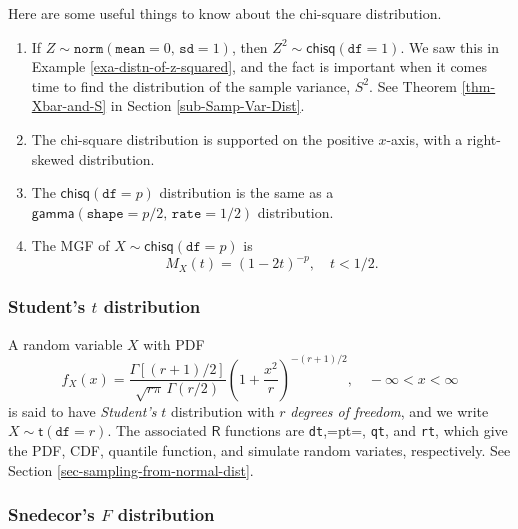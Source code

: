 \documentclass[captions=tableheading]{scrbook}
\begin{document}
\begin{rem}
Here are some useful things to know about the chi-square distribution.
\begin{enumerate}
\item If \(Z\sim\mathtt{norm}(\mathtt{mean}=0,\,\mathtt{sd}=1)\), then \(Z^{2}\sim\mathsf{chisq}(\mathtt{df}=1)\). We saw this in Example \ref{exa-distn-of-z-squared}, and the fact is important when it comes time to find the distribution of the sample variance, \(S^{2}\). See Theorem \ref{thm-Xbar-and-S} in Section \ref{sub-Samp-Var-Dist}.
\item The chi-square distribution is supported on the positive \(x\)-axis, with a right-skewed distribution.
\item The \(\mathsf{chisq}(\mathtt{df}=p)\) distribution is the same as a \(\mathsf{gamma}(\mathtt{shape}=p/2,\,\mathtt{rate}=1/2)\) distribution.
\item The MGF of \(X\sim\mathsf{chisq}(\mathtt{df}=p)\) is
   \begin{equation}
   M_{X}(t)=\left(1-2t\right)^{-p},\quad t<1/2.\label{eq-mgf-chisq}
   \end{equation}
\end{enumerate}

\end{rem}
\subsubsection{Student's \(t\) distribution}
\label{sec-1-5-2-2}
\label{sub-Student's-t-distribution}


A random variable \(X\) with PDF
\begin{equation}
f_{X}(x) = \frac{\Gamma\left[ (r+1)/2\right] }{\sqrt{r\pi}\,\Gamma(r/2)}\left( 1 + \frac{x^{2}}{r} \right)^{-(r+1)/2},\quad -\infty < x < \infty
\end{equation}
is said to have \emph{Student's} \(t\) distribution with \(r\) \emph{degrees of freedom}, and we write \(X\sim\mathsf{t}(\mathtt{df}=r)\). The associated \(\mathsf{R}\) functions are \texttt{dt},=pt=, \texttt{qt}, and \texttt{rt}, which give the PDF, CDF, quantile function, and simulate random variates, respectively. See Section \ref{sec-sampling-from-normal-dist}.
\subsubsection{Snedecor's \(F\) distribution}
\label{sec-1-5-2-3}
\label{sub-snedecor-F-distribution}
\end{document}
